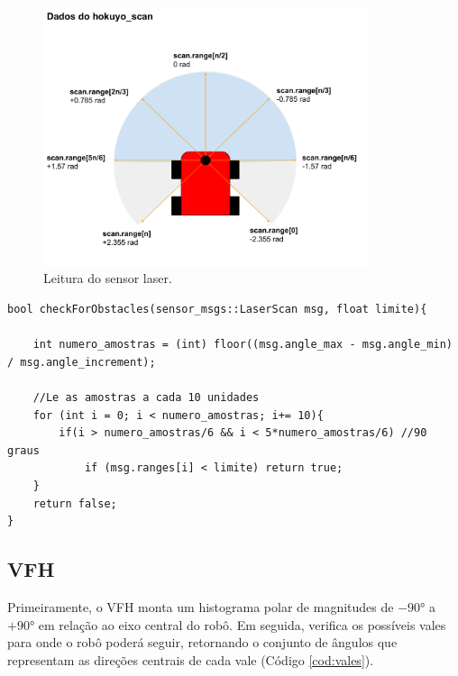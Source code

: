 \begin{figure}[H]
    \centering
    \includegraphics[width=0.85\textwidth]{img/SensorAngulos.pdf}
    \caption{Leitura do sensor laser.}
    \label{fig:laser_scan}
\end{figure}

\begin{lstlisting}[frame=single, label=cod:checkObstacles, style=customc,
caption={Algoritmo de Verificação de Obstáculos}]
bool checkForObstacles(sensor_msgs::LaserScan msg, float limite){
    
    int numero_amostras = (int) floor((msg.angle_max - msg.angle_min) / msg.angle_increment);
    
    //Le as amostras a cada 10 unidades
    for (int i = 0; i < numero_amostras; i+= 10){
        if(i > numero_amostras/6 && i < 5*numero_amostras/6) //90 graus
            if (msg.ranges[i] < limite) return true;
    }
    return false;
}
\end{lstlisting}


\subsection{VFH}

Primeiramente, o VFH monta um histograma polar de magnitudes de $-90°$ a $+90°$ em relação ao eixo central do
robô. Em seguida, verifica os possíveis vales para onde o robô poderá
seguir, retornando o conjunto de ângulos que representam as direções
centrais de cada vale (Código \ref{cod:vales}).

